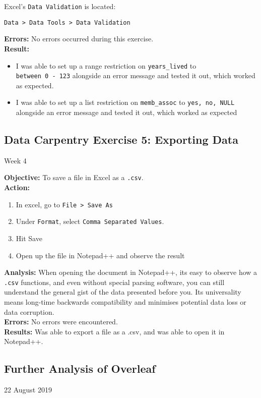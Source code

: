 \documentclass{article}
\begin{document}
Excel's \verb|Data Validation| is located: \begin{center}
\verb|Data > Data Tools > Data Validation|
\end{center}
\textbf{Errors:}
No errors occurred during this exercise.\\
\textbf{Result:}
\begin{itemize}
    \item I was able to set up a range restriction on \verb|years_lived| to \\\verb|between 0 - 123| alongside an error message and tested it out, which worked as expected.
    \item I was able to set up a list restriction on \verb|memb_assoc| to \verb|yes, no, NULL| alongside an error message and tested it out, which worked as expected
\end{itemize}
\newpage
\begin{center}
\section{Data Carpentry Exercise 5: Exporting Data}
Week 4
\end{center}
\textbf{Objective:} To save a file in Excel as a \verb|.csv|.\\
\textbf{Action:}
\begin{enumerate}
    \item In excel, go to \verb|File > Save As|
    \item Under \verb|Format|, select \verb|Comma Separated Values|.
    \item Hit Save
    \item Open up the file in Notepad++ and observe the result
\end{enumerate}
\textbf{Analysis:} When opening the document in Notepad++, its easy to observe how a \verb|.csv| functions, and even without special parsing software, you can still understand the general gist of the data presented before you. Its universality means long-time backwards compatibility and minimises potential data loss or data corruption.\\
\textbf{Errors:} No errors were encountered.\\
\textbf{Results:} Was able to export a file as a .csv, and was able to open it in Notepad++.
\newpage
\begin{center}
\section{Further Analysis of Overleaf}
22 August 2019
\end{center}
\end{document}
